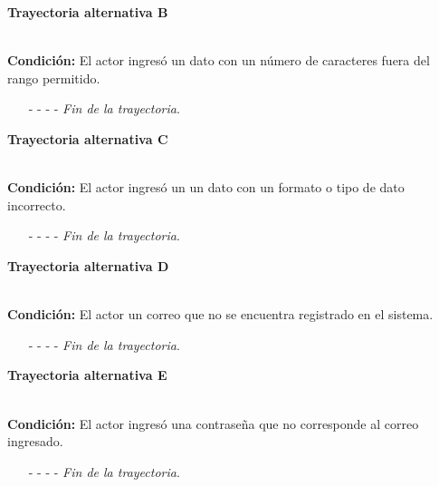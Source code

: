 		\hypertarget{CU1:TAB}{\textbf{Trayectoria alternativa B}}\\
		\noindent \textbf{Condición:} El actor ingresó un dato con un número de caracteres fuera del rango permitido.
		\begin{enumerate}
	\UCpaso[\UCsist] Muestra el  y señala el campo que presenta el error en la pantalla .
	\UCpaso[\UCactor] Regresa al paso \ref{P3} de la Trayectoria Principal.
	\item[- -] - - {\em {Fin de la trayectoria}}.
\end{enumerate}
		\hypertarget{CU1:TAC}{\textbf{Trayectoria alternativa C}}\\
		\noindent \textbf{Condición:} El actor ingresó un un dato con un formato o tipo de dato incorrecto.
	\begin{enumerate}
		\UCpaso[\UCsist] Muestra el mensaje  y señala el campo que presenta el dato inválido en la pantalla , para indicar que se ha ingresado un tipo de dato inválido.
		\UCpaso Regresa al paso \ref{P3} de la trayectoria principal.
		\item[- -] - - {\em {Fin de la trayectoria}}.
	\end{enumerate}

		\hypertarget{CU1:TAD}{\textbf{Trayectoria alternativa D}}\\
		\noindent \textbf{Condición:} El actor un correo que no se encuentra registrado en el sistema.
		\begin{enumerate}
	\UCpaso[\UCsist] Muestra el mensaje  en la pantalla  notificando que los datos ingresados son incorrectos.
	\UCpaso[\UCactor] Regresa al paso \ref{P3} de la Trayectoria Principal.
	\item[- -] - - {\em {Fin de la trayectoria}}.
\end{enumerate}

\hypertarget{CU1:TAE}{\textbf{Trayectoria alternativa E}}\\
\noindent \textbf{Condición:} El actor ingresó una contraseña que no corresponde al correo ingresado.
\begin{enumerate}
	\UCpaso[\UCsist] Muestra el mensaje  en la pantalla  notificando que los datos ingresados son incorrectos.
	\UCpaso[\UCactor] Regresa al paso \ref{P3} de la Trayectoria Principal.
	\item[- -] - - {\em {Fin de la trayectoria}}.
\end{enumerate}
	
